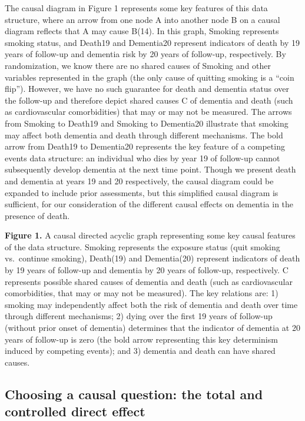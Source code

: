 \documentclass[
]{book}
\begin{document}
The causal diagram in Figure 1 represents some key features of this data structure, where an arrow from one node A into another node B on a causal diagram reflects that A may cause B(14). In this graph, Smoking represents smoking status, and Death19 and Dementia20 represent indicators of death by 19 years of follow-up and dementia risk by 20 years of follow-up, respectively. By randomization, we know there are no shared causes of Smoking and other variables represented in the graph (the only cause of quitting smoking is a ``coin flip''). However, we have no such guarantee for death and dementia status over the follow-up and therefore depict shared causes C of dementia and death (such as cardiovascular comorbidities) that may or may not be measured. The arrows from Smoking to Death19 and Smoking to Dementia20 illustrate that smoking may affect both dementia and death through different mechanisms. The bold arrow from Death19 to Dementia20 represents the key feature of a competing events data structure: an individual who dies by year 19 of follow-up cannot subsequently develop dementia at the next time point. Though we present death and dementia at years 19 and 20 respectively, the causal diagram could be expanded to include prior assessments, but this simplified causal diagram is sufficient, for our consideration of the different causal effects on dementia in the presence of death.

\textbf{Figure 1.} A causal directed acyclic graph representing some key causal features of the data structure. Smoking represents the exposure status (quit smoking vs.~continue smoking), Death(19) and Dementia(20) represent indicators of death by 19 years of follow-up and dementia by 20 years of follow-up, respectively. C represents possible shared causes of dementia and death (such as cardiovascular comorbidities, that may or may not be measured). The key relations are: 1) smoking may independently affect both the risk of dementia and death over time through different mechanisms; 2) dying over the first 19 years of follow-up (without prior onset of dementia) determines that the indicator of dementia at 20 years of follow-up is zero (the bold arrow representing this key determinism induced by competing events); and 3) dementia and death can have shared causes.

\hypertarget{choosing-a-causal-question-the-total-and-controlled-direct-effect}{%
\subsection{Choosing a causal question: the total and controlled direct effect}\label{choosing-a-causal-question-the-total-and-controlled-direct-effect}}
\end{document}
